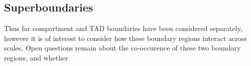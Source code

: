 \documentclass[a4paper,10pt,oneside]{book}
\begin{document}
\subsection{Superboundaries}

Thus far compartment and TAD boundaries have been considered separately, however it is of interest to consider how these boundary regions interact across scales. Open questions remain about the co-occurence of these two boundary regions, and whether 


\begin{small}

\end{small}
\end{document}
